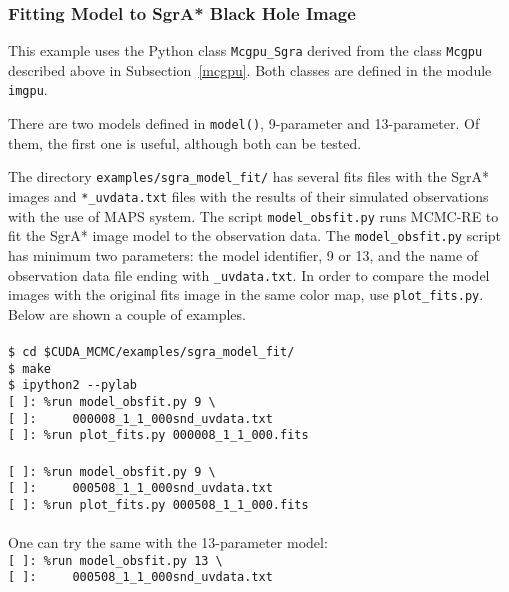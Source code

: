 \documentclass[preprint2]{aastex}
\begin{document}
\subsubsection{Fitting Model to SgrA* Black Hole Image}

This example uses the Python class \verb|Mcgpu_Sgra| derived from the class \verb|Mcgpu| described above in Subsection~\ref{mcgpu}. Both classes are defined in the module \verb|imgpu|.

There are two models defined in \verb|model()|, 9-parameter and 13-parameter. Of them, 
the first one is useful, although both can be tested. 

The directory \verb|examples/sgra_model_fit/| has several fits files with the SgrA* images
and \verb|*_uvdata.txt| files with the results of their simulated observations with the use 
of MAPS system. The script \verb|model_obsfit.py| runs MCMC-RE to fit the SgrA* image model
to the observation data. The \verb|model_obsfit.py| script has minimum two parameters: the 
model identifier, 9 or 13, and the name of observation data file ending with \verb|_uvdata.txt|.
In order to compare the model images with the original fits image in the same color map, use \verb|plot_fits.py|.
Below are shown a couple of examples.\\\\
\verb|$ cd $CUDA_MCMC/examples/sgra_model_fit/| \\
\verb|$ make| \\
\verb|$ ipython2 --pylab| \\
\verb|[ ]: %run model_obsfit.py 9 \| \\
\verb|[ ]:     000008_1_1_000snd_uvdata.txt| \\
\verb|[ ]: %run plot_fits.py 000008_1_1_000.fits| \\\\
\verb|[ ]: %run model_obsfit.py 9 \| \\
\verb|[ ]:     000508_1_1_000snd_uvdata.txt| \\
\verb|[ ]: %run plot_fits.py 000508_1_1_000.fits| \\\\
One can try the same with the 13-parameter model: \\
\verb|[ ]: %run model_obsfit.py 13 \| \\
\verb|[ ]:     000508_1_1_000snd_uvdata.txt| \\



\clearpage




\end{document}
